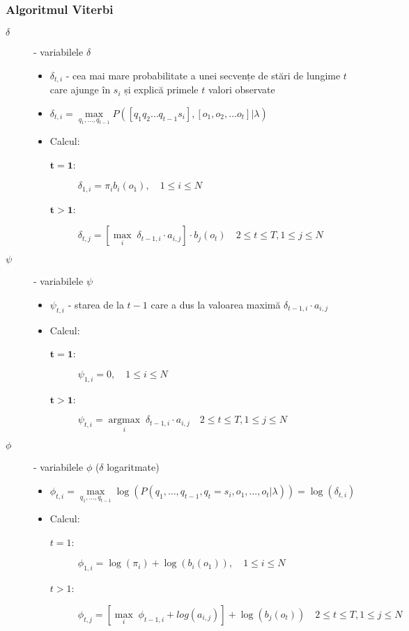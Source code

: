 \documentclass[12pt]{article}
\begin{document}
\subsubsection{Algoritmul Viterbi}
\label{sec:viterbi}

\begin{description}
\item[$\delta$] - variabilele $\delta$
  \begin{itemize}
  \item $\delta_{t,i}$ - cea mai mare probabilitate a unei secvențe de
    stări de lungime $t$ care ajunge în $s_i$ și explică primele $t$
    valori observate
  \item
    $\delta_{t,i}=\underset{q_1,\ldots,q_{t-1}}{\operatorname{max}}
    P([q_1 q_2 \ldots q_{t-1} s_i], [o_1, o_2, \ldots o_t] \vert
    \lambda)$
  \item Calcul:
    \begin{description}
    \item[$\mathbf{t=1}$:] $\delta_{1,i} = \pi_{i}b_i(o_1),
      \scriptstyle{\quad 1 \le i \le N}$
    \item[$\mathbf{t>1}$:] $\delta_{t,j} = [\underset{i
      }{\operatorname{max}}\; \delta_{t-1,i} \cdot a_{i,j}] \cdot
      b_{j}(o_{t}) \quad \scriptstyle{2 \le t \le T, 1 \le j \le N}$
    \end{description}
  \end{itemize}
\item[$\psi$] - variabilele $\psi$
  \begin{itemize}
  \item $\psi_{t,i}$ - starea de la $t-1$ care a dus la valoarea
    maximă $\delta_{t-1,i}\cdot a_{i,j}$
  \item Calcul:
    \begin{description}
    \item[$\mathbf{t=1}$:] $\psi_{1,i} = 0, \quad\scriptstyle{1 \le i
        \le N}$
    \item[$\mathbf{t>1}$:] $\psi_{t,i} =
      \underset{i}{\operatorname{argmax}}\; \delta_{t-1,i}\cdot
      a_{i,j} \quad \scriptstyle{2 \le t \le T, 1 \le j \le N}$
    \end{description}
  \end{itemize}
\item[$\phi$] - variabilele $\phi$ ($\delta$ logaritmate)
  \begin{itemize}
  \item $\phi_{t,i}=\underset{q_1,\ldots,q_{t-1}}{\operatorname{max}}
    \log(P(q_1,\ldots,q_{t-1},q_t=s_i,o_1,\ldots,o_t\vert
    \lambda))=\log(\delta_{t,i})$
  \item Calcul:
    \begin{description}
    \item[$t=1$:] $\phi_{1,i} = \log(\pi_{i}) + \log(b_i(o_1)),
      \quad\scriptstyle{1 \le i \le N}$
    \item[$t>1$:] $\phi_{t,j} = [\underset{i}{\operatorname{max}}\; \phi_{t-1,i} +
        log(a_{i,j})] + \log(b_{j}(o_{t}))
        \quad \scriptstyle{2 \le t \le T, 1 \le j \le N}$
    \end{description}
  \end{itemize}
\end{description}
\end{document}
